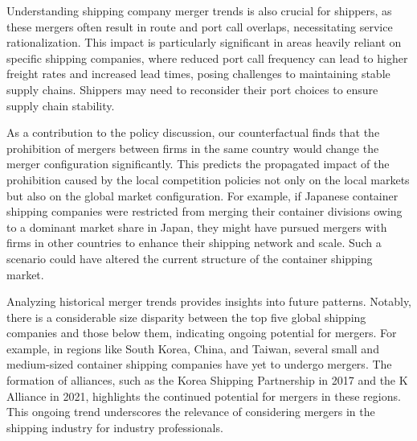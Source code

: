 \documentclass[10pt]{article}
\begin{document}
Understanding shipping company merger trends is also crucial for shippers, as these mergers often result in route and port call overlaps, necessitating service rationalization. This impact is particularly significant in areas heavily reliant on specific shipping companies, where reduced port call frequency can lead to higher freight rates and increased lead times, posing challenges to maintaining stable supply chains. Shippers may need to reconsider their port choices to ensure supply chain stability.

As a contribution to the policy discussion, our counterfactual finds that the prohibition of mergers between firms in the same country would change the merger configuration significantly. 
This predicts the propagated impact of the prohibition caused by the local competition policies not only on the local markets but also on the global market configuration. 
For example, if Japanese container shipping companies were restricted from merging their container divisions owing to a dominant market share in Japan, they might have pursued mergers with firms in other countries to enhance their shipping network and scale. Such a scenario could have altered the current structure of the container shipping market.

Analyzing historical merger trends provides insights into future patterns. Notably, there is a considerable size disparity between the top five global shipping companies and those below them, indicating ongoing potential for mergers. For example, in regions like South Korea, China, and Taiwan, several small and medium-sized container shipping companies have yet to undergo mergers. The formation of alliances, such as the Korea Shipping Partnership in 2017 and the K Alliance in 2021, highlights the continued potential for mergers in these regions. This ongoing trend underscores the relevance of considering mergers in the shipping industry for industry professionals.
\end{document}
